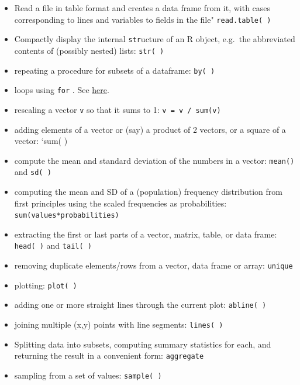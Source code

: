 \documentclass[]{book}
\begin{document}
\begin{itemize}
\item
  Read a file in table format and creates a data frame from it, with cases corresponding to lines and variables to fields in the file" \texttt{read.table(\ )}
\item
  Compactly display the internal \texttt{str}ucture of an R object, e.g.~the abbreviated contents of (possibly nested) lists: \texttt{str(\ )}
\item
  repeating a procedure for subsets of a dataframe: \texttt{by(\ )}
\item
  loops using \texttt{for} . See \href{https://www.datacamp.com/community/tutorials/tutorial-on-loops-in-r?utm_source=adwords_ppc\&utm_campaignid=1655852085\&utm_adgroupid=61045433942\&utm_device=c\&utm_keyword=\%2Bfor\%20\%2Br\&utm_matchtype=b\&utm_network=g\&utm_adpostion=\&utm_creative=318880582248\&utm_targetid=aud-392016246653:kwd-310330089735\&utm_loc_interest_ms=\&utm_loc_physical_ms=9000568\&gclid=EAIaIQobChMIhMf41qfU6QIVT_DACh1Oegu5EAAYASAAEgLBa_D_BwE}{here}.
\item
  rescaling a vector \texttt{v} so that it sums to 1: \texttt{v\ =\ v\ /\ sum(v)}
\item
  adding elements of a vector or (say) a product of 2 vectors, or a square of a vector: `sum( )
\item
  compute the mean and standard deviation of the numbers in a vector: \texttt{mean()} and \texttt{sd(\ )}
\item
  computing the mean and SD of a (population) frequency distribution from first principles using the scaled frequencies as probabilities: \texttt{sum(values*probabilities)}
\item
  extracting the first or last parts of a vector, matrix, table, or data frame: \texttt{head(\ )} and \texttt{tail(\ )}
\item
  removing duplicate elements/rows from a vector, data frame or array: \texttt{unique}
\item
  plotting: \texttt{plot(\ )}
\item
  adding one or more straight lines through the current plot: \texttt{abline(\ )}
\item
  joining multiple (x,y) points with line segments: \texttt{lines(\ )}
\item
  Splitting data into subsets, computing summary statistics for each, and returning the result in a convenient form: \texttt{aggregate}
\item
  sampling from a set of values: \texttt{sample(\ )}

\end{itemize}
\end{document}
